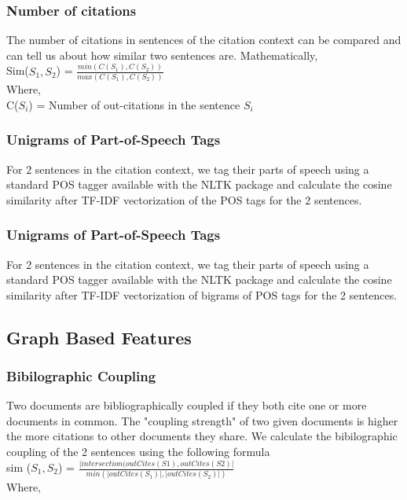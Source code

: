 \subsubsection{Number of citations}
The number of citations in sentences of the citation context can be compared and can tell us about how similar two sentences are. Mathematically,  \\
Sim($ S_1, S_2 $) = $\frac{min (C(S_1), C(S_2))}{max (C(S_1), C(S_2))} $\\
Where,\\ C($S_i$) = Number of out-citations in the sentence $S_i$

\subsubsection{Unigrams of Part-of-Speech Tags}
For 2 sentences in the citation context, we tag their parts of speech using a standard POS tagger available with the NLTK package and calculate the cosine similarity after TF-IDF vectorization of the POS tags for the 2 sentences.

\subsubsection{Unigrams of Part-of-Speech Tags}
For 2 sentences in the citation context, we tag their parts of speech using a standard POS tagger available with the NLTK package and calculate the cosine similarity after TF-IDF vectorization of bigrams of POS tags for the 2 sentences.

\subsection{Graph Based Features}

\subsubsection{Bibilographic Coupling} 
Two documents are bibliographically coupled if they both cite one or more documents in common. The "coupling strength" of two given documents is higher the more citations to other documents they share. We calculate the bibilographic coupling of the 2 sentences using the following formula \\ 

sim ($S_1, S_2$) = $\frac{\lvert intersection(outCites(S1), outCites(S2) \rvert} { min ( \lvert outCites(S_1) \rvert, \lvert outCites(S_2) \rvert )}$ \\
Where, \\

